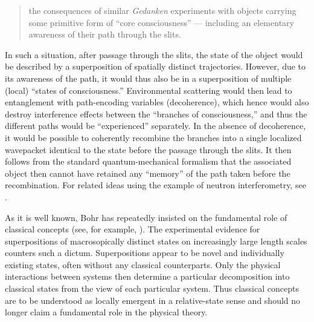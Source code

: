 \documentclass[12pt,aps,floatfix,amsmath,amssymb,showpacs,nofootinbib]{revtex4-2}
\begin{document}
\begin{quote}
  the consequences of similar \emph{Gedanken} experiments with objects
  carrying some primitive form of ``core consciousness'' --- including
  an elementary awareness of their path through the slits.
\end{quote}

In such a situation, after passage through the slits, the state of the
object would be described by a superposition of spatially distinct
trajectories. However, due to its awareness of the path, it would thus
also be in a superposition of multiple (local) ``states of
consciousness.''  Environmental scattering would then lead to
entanglement with path-encoding variables (decoherence), which hence
would also destroy interference effects between the ``branches of
consciousness,'' and thus the different paths would be ``experienced''
separately. In the absence of decoherence, it would be possible to
coherently recombine the branches into a single localized wavepacket
identical to the state before the passage through the slits.  It then
follows from the standard quantum-mechanical formalism that the
associated object then cannot have retained any ``memory'' of the path
taken before the recombination.  For related ideas using the example
of neutron interferometry, see \cite{Vaidmain:1998:zp}.

As it is well known, Bohr has repeatedly insisted on the fundamental
role of classical concepts (see, for example,
\cite{Bohr:1923:um,Bohr:1948:um}). The experimental evidence for
superpositions of macrosopically distinct states on increasingly large
length scales counters such a dictum. Superpositions appear to be
novel and individually existing states, often without any classical
counterparts.  Only the physical interactions between systems then
determine a particular decomposition into classical states from the
view of each particular system. Thus classical concepts are to be
understood as locally emergent in a relative-state sense and should no
longer claim a fundamental role in the physical theory.
\end{document}
